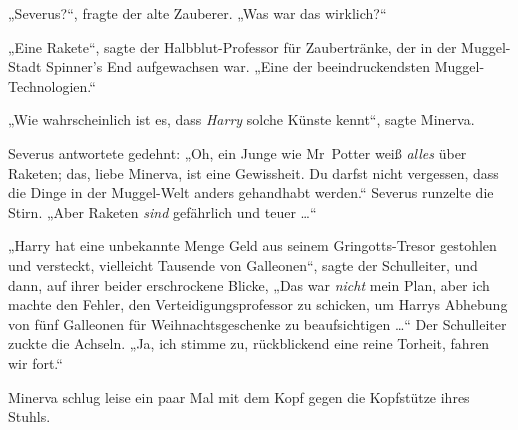 „Severus?“, fragte der alte Zauberer.
„Was war das wirklich?“

„Eine Rakete“, sagte der Halbblut-Professor für Zaubertränke, der in der Muggel-Stadt Spinner’s End aufgewachsen war.
„Eine der beeindruckendsten Muggel-Technologien.“

„Wie wahrscheinlich ist es, dass \emph{Harry} solche Künste kennt“, sagte Minerva.

Severus antwortete gedehnt:
„Oh, ein Junge wie Mr~Potter weiß \emph{alles} über Raketen; das, liebe Minerva, ist eine Gewissheit. Du darfst nicht vergessen, dass die Dinge in der Muggel-Welt anders gehandhabt werden.“ Severus runzelte die Stirn.
„Aber Raketen \emph{sind} gefährlich und teuer …“

„Harry hat eine unbekannte Menge Geld aus seinem Gringotts-Tresor gestohlen und versteckt, vielleicht Tausende von Galleonen“, sagte der Schulleiter, und dann, auf ihrer beider erschrockene Blicke,
„Das war \emph{nicht} mein Plan, aber ich machte den Fehler, den Verteidigungsprofessor zu schicken, um Harrys Abhebung von fünf Galleonen für Weihnachtsgeschenke zu beaufsichtigen …“ Der Schulleiter zuckte die Achseln.
„Ja, ich stimme zu, rückblickend eine reine Torheit, fahren wir fort.“

Minerva schlug leise ein paar Mal mit dem Kopf gegen die Kopfstütze ihres Stuhls.

